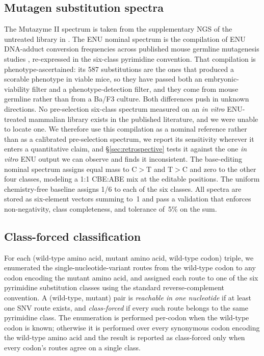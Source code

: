 \documentclass[11pt,a4paper]{article}
\begin{document}
\subsection{Mutagen substitution spectra}

The Mutazyme II spectrum is taken from the supplementary NGS of the
untreated library in \citep{doi2022}. The ENU nominal spectrum is the
compilation \citep{arnold2012} of ENU DNA-adduct conversion
frequencies across published mouse germline mutagenesis studies
\citep{arnold2012}, re-expressed in the six-class pyrimidine
convention. That compilation is phenotype-ascertained: its 587
substitutions are the ones that produced a scorable phenotype in
viable mice, so they have passed both an embryonic-viability filter
and a phenotype-detection filter, and they come from mouse germline
rather than from a Ba/F3 culture. Both differences push in unknown
directions. No pre-selection six-class spectrum measured on an
\emph{in vitro} ENU-treated mammalian library exists in the published
literature, and we were unable to locate one. We therefore use this
compilation as a nominal reference rather than as a calibrated
pre-selection spectrum, we report its sensitivity wherever it enters a
quantitative claim, and \S\ref{sec:retrospective} tests it against the
one \emph{in vitro} ENU output we can observe and finds it
inconsistent. The base-editing nominal spectrum assigns equal mass
to C$>$T and T$>$C and zero to the other four classes, modeling
a 1:1 CBE:ABE mix at the editable positions. The uniform
chemistry-free baseline assigns 1/6 to each of the six classes.
All spectra are stored as six-element vectors summing to~1 and
pass a validation that enforces non-negativity, class completeness,
and tolerance of~5\% on the sum.

\subsection{Class-forced classification}

For each (wild-type amino acid, mutant amino acid, wild-type codon)
triple, we enumerated the single-nucleotide-variant routes from the
wild-type codon to any codon encoding the mutant amino acid, and
assigned each route to one of the six pyrimidine substitution
classes using the standard reverse-complement convention. A
(wild-type, mutant) pair is \emph{reachable in one nucleotide}
if at least one SNV route exists, and \emph{class-forced} if every
such route belongs to the same pyrimidine class. The enumeration
is performed per-codon when the wild-type codon is known;
otherwise it is performed over every synonymous codon encoding
the wild-type amino acid and the result is reported as class-forced
only when every codon's routes agree on a single class.
\end{document}
